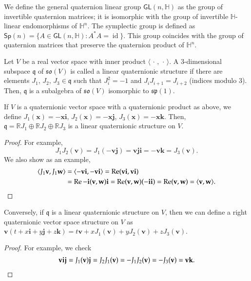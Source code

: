 \documentclass[12pt, a4paper]{amsart}
\newcommand{\id}{\operatorname{id}}
\newcommand{\g}{\mathfrak}
\newcommand{\R}{\mathbb{R}}
\renewcommand{\H}{\mathbb{H}}
\renewcommand{\Re}{\operatorname{Re}}
\newcommand{\Sp}{\mathsf{Sp}}
\theoremstyle{remark}
\begin{document}
We define the general quaternion linear group $\mathsf{GL}(n,\H)$ as the group of invertible quaternion matrices; it is isomorphic with the group of invertible $\H$-linear endomorphisms of $\H^n$. 
The symplectic group is defined as $\Sp(n)=\{A\in\mathsf{GL}(n,\H):A^* A=\id\}$.
This group coincides with the group of quaternion matrices that preserve the quaternion product of $\H^n$.	

\medskip

Let $V$ be a real vector space with inner product $\langle\,\cdot\,,\,\cdot\,\rangle$.
A $3$-dimensional subspace $\g{q}$ of $\g{so}(V)$ is called a linear quaternionic structure if there are elements $J_1$, $J_2$, $J_3\in\g{q}$ such that $J_i^2=-1$ and $J_iJ_{i+1}=J_{i+2}$ (indices modulo 3).
Then, $\g{q}$ is a subalgebra of $\g{so}(V)$ isomorphic to $\g{sp}(1)$.

If $V$ is a quaternionic vector space with a quaternionic product as above, we define $J_1(\mathbf{x})=-\mathbf{x}\mathbf{i}$, $J_2(\mathbf{x})=-\mathbf{x}\mathbf{j}$, $J_3(\mathbf{x})=-\mathbf{x}\mathbf{k}$.
Then, $\g{q}=\R J_1\oplus\R J_2\oplus\R J_3$ is a linear quaternionic structure on $V$.

\begin{proof}
For example,
\[
J_1 J_2(\mathbf{v})
=J_1(-\mathbf{v}\mathbf{j})
=\mathbf{v}\mathbf{j}\mathbf{i}
=-\mathbf{v}\mathbf{k}
=J_3(\mathbf{v}).
\]
We also show as an example,
\begin{align*}
\langle J_1\mathbf{v},J_1\mathbf{w}\rangle
&{}=\langle -\mathbf{v}\mathbf{i},-\mathbf{v}\mathbf{i}\rangle
=\Re (\mathbf{v}\mathbf{i},\mathbf{v}\mathbf{i})\\
&{}=\Re -\mathbf{i} (\mathbf{v},\mathbf{w}) \mathbf{i}
=\Re (\mathbf{v},\mathbf{w}) (-\mathbf{i}\mathbf{i})
=\Re (\mathbf{v},\mathbf{w})
=\langle \mathbf{v},\mathbf{w}\rangle.\qedhere
\end{align*}
\end{proof}

Conversely, if $\g{q}$ is a linear quaternionic structure on $V$, then we can define a right quaternionic vector space structure on $V$ as $\mathbf{v}(t+x\mathbf{i}+y\mathbf{j}+z\mathbf{k})=t\mathbf{v}+xJ_1(\mathbf{v})+yJ_2(\mathbf{v})+zJ_3(\mathbf{v})$.

\begin{proof}
For example, we check
\[
\begin{aligned}
\mathbf{v}\mathbf{i}\mathbf{j}
=J_1(\mathbf{v})\mathbf{j}
=J_2 J_1(\mathbf{v})
=-J_1 J_2(\mathbf{v})
=-J_3(\mathbf{v})
=\mathbf{v}\mathbf{k}.
\end{aligned} \qedhere
\]
\end{proof}
\end{document}
